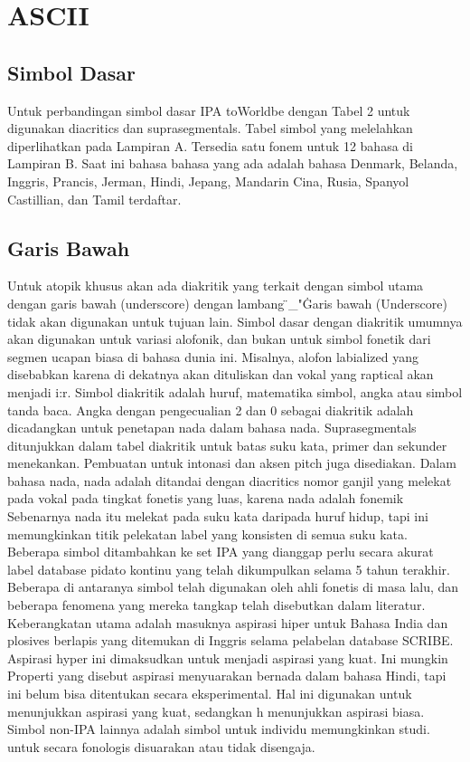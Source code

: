 \section{ASCII}
\subsection{Simbol Dasar}
Untuk perbandingan simbol dasar IPA toWorldbe dengan  Tabel 2 untuk digunakan diacritics dan suprasegmentals. Tabel simbol yang melelahkan diperlihatkan pada Lampiran A. Tersedia satu fonem untuk 12 bahasa di Lampiran B. Saat ini bahasa bahasa yang ada adalah bahasa Denmark, Belanda, Inggris, Prancis, Jerman, Hindi, Jepang, Mandarin Cina, Rusia, Spanyol Castillian, dan Tamil terdaftar.
\subsection{Garis Bawah}
Untuk atopik khusus akan ada diakritik yang terkait dengan simbol utama dengan garis bawah (underscore) dengan lambang \"_"\. Garis bawah (Underscore) tidak akan digunakan untuk tujuan lain. Simbol dasar dengan diakritik umumnya akan digunakan untuk variasi alofonik, dan bukan untuk simbol fonetik dari segmen ucapan biasa di
bahasa dunia ini.
Misalnya, alofon labialized  yang disebabkan karena  di dekatnya
akan dituliskan  dan vokal yang raptical akan menjadi i:r. Simbol diakritik adalah huruf, matematika simbol, angka atau simbol tanda baca. Angka dengan pengecualian 2 dan 0 sebagai diakritik adalah
dicadangkan untuk penetapan nada dalam bahasa nada.
Suprasegmentals ditunjukkan dalam tabel diakritik untuk batas suku kata, primer dan sekunder menekankan. 
Pembuatan untuk intonasi dan aksen pitch juga disediakan. Dalam bahasa nada, nada adalah ditandai dengan diacritics nomor ganjil yang melekat pada vokal pada tingkat fonetis yang luas, karena nada
adalah fonemik Sebenarnya nada itu melekat pada suku kata daripada huruf hidup, tapi ini memungkinkan titik pelekatan label yang konsisten di semua suku kata.
Beberapa simbol ditambahkan ke set IPA yang dianggap perlu secara akurat
label database pidato kontinu yang telah dikumpulkan selama 5 tahun terakhir. Beberapa di antaranya simbol telah digunakan oleh ahli fonetis di masa lalu, dan beberapa fenomena yang mereka tangkap
telah disebutkan dalam literatur.
Keberangkatan utama adalah masuknya aspirasi hiper untuk Bahasa India dan plosives berlapis yang ditemukan di Inggris selama pelabelan
database SCRIBE. Aspirasi hyper ini dimaksudkan untuk menjadi aspirasi yang kuat. Ini mungkin Properti yang disebut aspirasi menyuarakan bernada dalam bahasa Hindi, tapi ini belum bisa ditentukan secara eksperimental. Hal ini digunakan untuk menunjukkan aspirasi yang kuat, sedangkan h menunjukkan aspirasi biasa. Simbol non-IPA lainnya adalah simbol untuk individu memungkinkan studi. untuk secara fonologis disuarakan atau tidak disengaja. 
